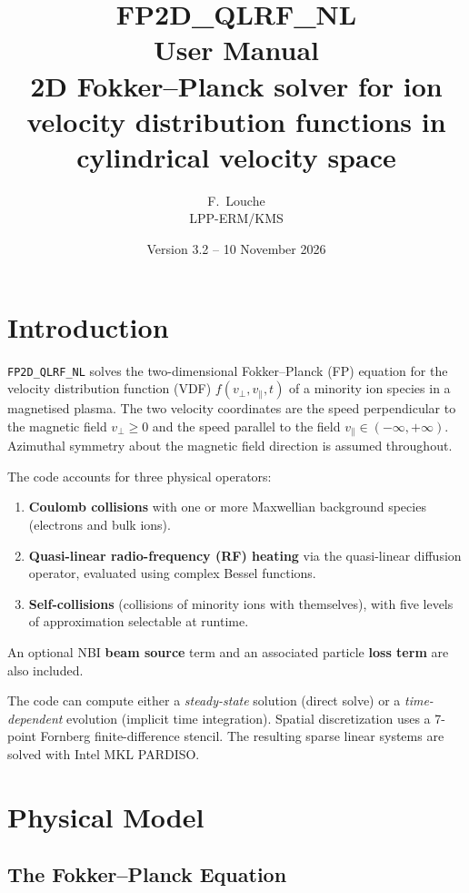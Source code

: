 \documentclass[11pt,a4paper]{article}
\title{\textbf{FP2D\_QLRF\_NL}\\[0.4em]
       \large User Manual\\[0.4em]
       \normalsize 2D Fokker--Planck solver for ion velocity distribution
       functions in cylindrical velocity space}
\author{F.~Louche\\LPP-ERM/KMS}
\date{Version 3.2 -- 10 November 2026}
\newcommand{\vp}{v_\perp}
\newcommand{\vpa}{v_\parallel}
\begin{document}
\maketitle
\tableofcontents
\newpage

\section{Introduction}

\texttt{FP2D\_QLRF\_NL} solves the two-dimensional Fokker--Planck (FP) equation
for the velocity distribution function (VDF) $f(\vp,\vpa,t)$ of a minority ion
species in a magnetised plasma.  The two velocity coordinates are the speed
perpendicular to the magnetic field $\vp \ge 0$ and the speed parallel to the
field $\vpa \in (-\infty,+\infty)$.  Azimuthal symmetry about the magnetic
field direction is assumed throughout.

The code accounts for three physical operators:
\begin{enumerate}
  \item \textbf{Coulomb collisions} with one or more Maxwellian background
        species (electrons and bulk ions).
  \item \textbf{Quasi-linear radio-frequency (RF) heating} via the
        quasi-linear diffusion operator, evaluated using complex Bessel
        functions.
  \item \textbf{Self-collisions} (collisions of minority ions with
        themselves), with five levels of approximation selectable at runtime.
\end{enumerate}
An optional NBI \textbf{beam source} term and an associated particle
\textbf{loss term} are also included.

The code can compute either a \emph{steady-state} solution (direct solve) or
a \emph{time-dependent} evolution (implicit time integration).  Spatial
discretization uses a 7-point Fornberg finite-difference stencil.  The
resulting sparse linear systems are solved with Intel MKL PARDISO.


\section{Physical Model}

\subsection{The Fokker--Planck Equation}
\end{document}

